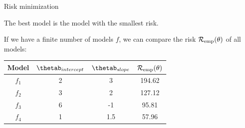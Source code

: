 \documentclass[11pt,compress,t,notes=noshow, xcolor=table]{beamer}
\begin{document}
\begin{vbframe}{Risk minimization}

The best model is the model with the smallest risk. 

\lz

If we have a finite number of models $f$, we can compare the risk $\mathcal{R}_{\text{emp}}(\theta)$ of all models: 



\begin{center}
\begin{tabular}{ c | c | c || c }
 Model & \(\displaystyle \thetab_{intercept} \) & \(\displaystyle \thetab_{slope} \) & \(\displaystyle \mathcal{R}_{\text{emp}}(\theta) \) \\ 
 \hline
\(\displaystyle f_1 \)   & 2 & 3 & 194.62 \\
\(\displaystyle f_2 \)   & 3 & 2 & 127.12 \\  
\(\displaystyle f_3 \)   & 6 & -1 & 95.81 \\
\rowcolor{lightgray}
\(\displaystyle f_4 \)   & 1 & 1.5 & 57.96 \\  
\end{tabular}
\end{center}


\end{vbframe}
\end{document}
